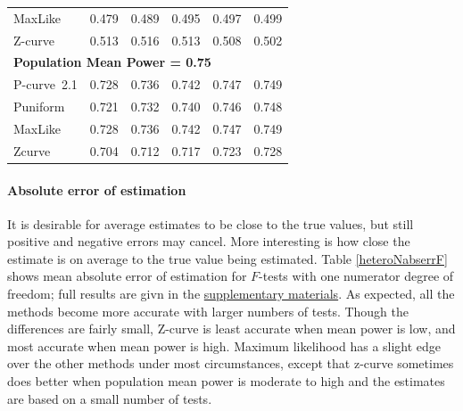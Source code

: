 \documentclass[jou]{apa6} %
\begin{document}
\begin{table}
{\begin{center}
\begin{tabular}{lrrrrr}
MaxLike   & 0.479 & 0.489 & 0.495 & 0.497 & 0.499 \\
Z-curve   & 0.513 & 0.516 & 0.513 & 0.508 & 0.502 \\ \hline
\multicolumn{6}{l}{\textbf{Population Mean Power = 0.75}} \\ \hline
P-curve~2.1   & 0.728 & 0.736 & 0.742 & 0.747 & 0.749 \\
Puniform & 0.721 & 0.732 & 0.740 & 0.746 & 0.748  \\
MaxLike  & 0.728 & 0.736 & 0.742 & 0.747 & 0.749 \\
Zcurve   & 0.704 & 0.712 & 0.717 & 0.723 & 0.728 \\ \hline
\end{tabular}
\end{center}
} %
\label{heteroNmean}  %
\end{table}

\paragraph{Absolute error of estimation}
It is desirable for average estimates to be close to the true values, but still positive and negative errors may cancel. More interesting is how close the estimate is on average to the true value being estimated. Table \ref{heteroNabserrF} shows mean absolute error of estimation for $F$-tests with one numerator degree of freedom; full results are givn in the \href{http://www.utstat.toronto.edu/~brunner/zcurve2018} {supplementary materials}. As expected, all the methods become more accurate with larger numbers of tests. Though the differences are fairly small, Z-curve is least accurate when mean power is low, and most accurate when mean power is high. Maximum likelihood has a slight edge over the other methods under most circumstances, except that z-curve sometimes does better when population mean power is moderate to high and the estimates are based on a small number of tests.
\end{document}
